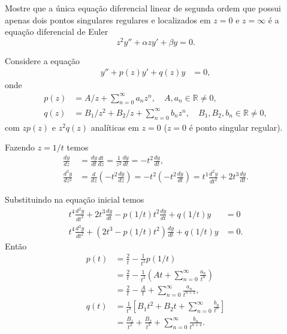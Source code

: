 \documentclass[a4paper,12pt, leqno, answers]{exam}
\begin{document}
\begin{questions}
    \question[P1 de 2011] Mostre que a única equa\c{c}\~{a}o diferencial linear de segunda ordem que possui apenas dois pontos singulares regulares e localizados em $z = 0$ e $z = \infty$ \'{e} a equa\c{c}\~{a}o diferencial de Euler
    \[
    z^2 y'' + \alpha z y' + \beta y = 0.
    \]
    \begin{solution}
        Considere a equa\c{c}\~{a}o
        \begin{align*}
            y'' + p(z) y' + q(z) y &= 0,
        \end{align*}
        onde
        \begin{align*}
            p(z) &= A / z + \sum_{n = 0}^\infty a_n z^n, \quad A, a_n \in \mathbb{R} \neq 0, \\
            q(z) &= B_1 / z^2 + B_2 / z + \sum_{n = 0}^\infty b_n z^n, \quad B_1, B_2, b_n \in \mathbb{R} \neq 0,
        \end{align*}
        com $z p(z)$ e $z^2 q(z)$ anal\'{i}ticas em $z = 0$ ($z = 0$ \'{e} ponto singular regular).

        Fazendo $z = 1 / t$ temos
        \begin{align*}
            \frac{d y}{d z} &= \frac{d y}{d t} \frac{d t}{d z} = \frac{1}{z^2} \frac{d y}{d t} = - t^2 \frac{d y}{d t}, \\
            \frac{d^2 y}{d z^2} &= \frac{d}{d z} \left( - t^2 \frac{d y}{d z} \right) = - t^2 \left( - t^2 \frac{d y}{d t} \right) = t^1 \frac{d^2 y}{d t^2} + 2 t^3 \frac{d y}{d t}.
        \end{align*}

        Substituindo na equa\c{c}\~{a}o inicial temos
        \begin{align*}
            t^4 \frac{d^2 y}{d t^2} + 2 t^3 \frac{d y}{d t} - p \left( 1 / t \right) t^2 \frac{d y}{d t} + q \left( 1 / t \right) y &= 0 \\
            t^4 \frac{d^2 y}{d t^2} + \left( 2 t^3 - p \left( 1 / t \right) t^2 \right) \frac{d y}{d t} + q \left( 1 / t \right) y &= 0.
        \end{align*}
        Ent\~{a}o
        \begin{align*}
            p(t) &= \frac{2}{t} - \frac{1}{t^2} p \left( 1 / t \right) \\
            &= \frac{2}{t} - \frac{1}{t^2} \left( A t + \sum_{n = 0}^\infty \frac{a_n}{t^n} \right) \\
            &= \frac{2}{t} - \frac{A}{t} + \sum_{n = 0}^\infty \frac{a_n}{t^{n + 2}}, \\
            q(t) &= \frac{1}{t^4} \left[ B_1 t^2 + B_2 t + \sum_{n = 0}^\infty \frac{b_n}{t^n} \right] \\
            &= \frac{B_1}{t^2} + \frac{B_2}{t^3} + \sum_{n = 0}^\infty \frac{b_n}{t^{n + 4}}.
        \end{align*}


\end{solution}
\end{questions}
\end{document}
